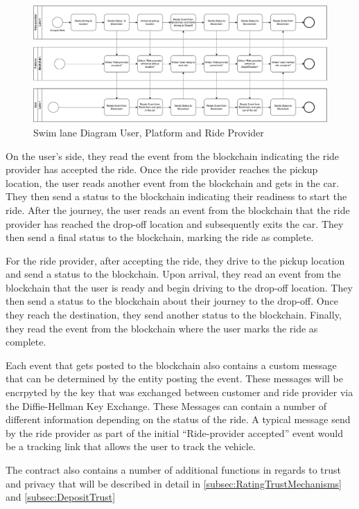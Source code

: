 \begin{figure}[h]
    \centering
    \includegraphics[width=\linewidth]{data/1.svg}
    \caption{Swim lane Diagram User, Platform and Ride Provider}
    \label{fig:directSVG}
\end{figure}

On the user's side, they read the event from the blockchain indicating the ride provider has accepted the ride. Once the ride provider reaches the pickup location, the user reads another event from the blockchain and gets in the car. They then send a status to the blockchain indicating their readiness to start the ride. After the journey, the user reads an event from the blockchain that the ride provider has reached the drop-off location and subsequently exits the car. They then send a final status to the blockchain, marking the ride as complete.

For the ride provider, after accepting the ride, they drive to the pickup location and send a status to the blockchain. Upon arrival, they read an event from the blockchain that the user is ready and begin driving to the drop-off location. They then send a status to the blockchain about their journey to the drop-off. Once they reach the destination, they send another status to the blockchain. Finally, they read the event from the blockchain where the user marks the ride as complete.

Each event that gets posted to the blockchain also contains a custom message that can be determined by the entity posting the event. These messages will be encrpyted by the key that was exchanged between customer and ride provider via the Diffie-Hellman Key Exchange. These Messages can contain a number of different information depending on the status of the ride. A typical message send by the ride provider as part of the initial ``Ride-provider accepted'' event would be a tracking link that allows the user to track the vehicle. 

The contract also contains a number of additional functions in regards to trust and privacy that will be described in detail in \ref{subsec:RatingTrustMechanisms} and \ref{subsec:DepositTrust}

